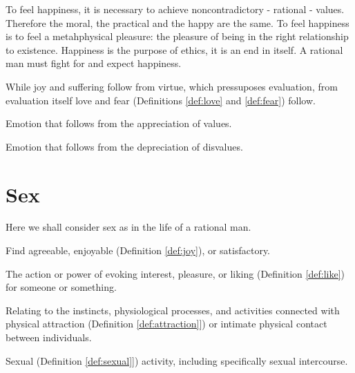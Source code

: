         To feel happiness, it is necessary to achieve noncontradictory - rational - values. Therefore the moral, the practical and the happy are the same. To feel happiness is to feel a metahphysical pleasure: the pleasure of being in the right relationship to existence. Happiness is the purpose of ethics, it is an end in itself. A rational man must fight for and expect happiness.

        While joy and suffering follow from virtue, which pressuposes evaluation, from evaluation itself love and fear (Definitions \ref{def:love} and \ref{def:fear}) follow.

        \begin{definition}[Love]
        \label{def:love}
            Emotion that follows from the appreciation of values.
        \end{definition}

        \begin{definition}[Fear]
        \label{def:fear}
            Emotion that follows from the depreciation of disvalues.
        \end{definition}

    \section{Sex}

        Here we shall consider sex as in the life of a rational man.

        \begin{definition}[Like]
        \label{def:like}
            Find agreeable, enjoyable (Definition \ref{def:joy}), or satisfactory.
        \end{definition}

        \begin{definition}[Attraction]
        \label{def:attraction}
            The action or power of evoking interest, pleasure, or liking (Definition \ref{def:like}) for someone or something.
        \end{definition}

        \begin{definition}[Sexual]
        \label{def:sexual}
            Relating to the instincts, physiological processes,
                and activities connected with physical attraction (Definition \ref{def:attraction}]) or intimate physical contact between individuals.
        \end{definition}

        \begin{definition}[Sex]
        \label{def:sex}
             Sexual (Definition \ref{def:sexual}]) activity, including specifically sexual intercourse.
         \end{definition}

